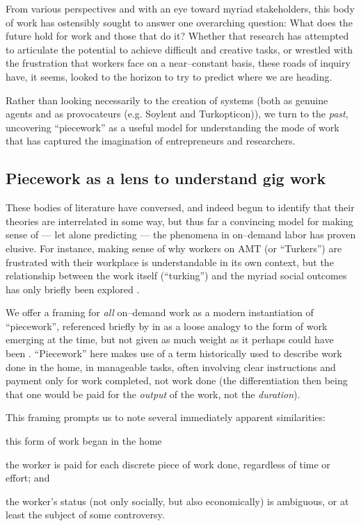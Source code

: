 \documentclass[trackingWork]{subfiles}
\begin{document}
From various perspectives and with an eye toward myriad stakeholders,
this body of work has ostensibly sought to answer one overarching question:
What does the future hold for work and those that do it? %
Whether that research has attempted to articulate the potential to achieve difficult and creative tasks,
or wrestled with the frustration that workers face on a near--constant basis,
these roads of inquiry have, it seems, looked to the horizon to try to predict where we are heading.

Rather than looking necessarily to the creation of systems
(both as genuine agents and as provocateurs (e.g. Soylent and Turkopticon)),
we turn to the \textit{past}, uncovering ``piecework'' as
a useful model for understanding the mode of work that has captured the imagination of entrepreneurs and researchers.


\subsection{Piecework as a lens to understand gig work}
These bodies of literature have conversed,
and indeed begun to identify that their theories are interrelated in some way,
but thus far a convincing model for making sense of
--- let alone predicting ---
the phenomena in on--demand labor has proven elusive.
For instance, 
making sense of why workers on AMT (or ``Turkers'') are frustrated with their workplace
is understandable in its own context, but
the relationship between the work itself (``turking'')
and the myriad social outcomes has only briefly been explored
\cite{crowdcollab}.

We offer a framing for \textit{all} on--demand work as a modern instantiation of ``piecework'',
referenced briefly by
\citeauthor{crowdworkFuture}
in
\citeyear{crowdworkFuture}
as a loose analogy to the form of work emerging at the time,
but not given as much weight as it perhaps could have been
\cite{crowdworkFuture}.
``Piecework'' here makes use of
a term historically used to describe work done in the home,
in manageable tasks,
often involving clear instructions
and payment only for work completed, not work done
(the differentiation then being that
one would be paid for the \textit{output} of the work,
not the \textit{duration}).

This framing prompts us to note several immediately apparent similarities:
\begin{inlinelist}
\item this form of work began in the home
\item the worker is paid for each discrete piece of work done, regardless of time or effort; and
\item the worker's status
(not only socially, but also economically)
is ambiguous, or at least the subject of some controversy.
\end{inlinelist}
\end{document}
